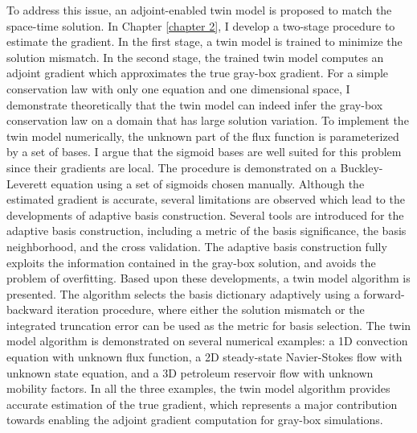 To address this issue, an adjoint-enabled twin model is proposed 
to match the space-time solution.
In Chapter \ref{chapter 2}, I develop a two-stage procedure to estimate the gradient.
In the first stage, a twin model is trained to minimize the solution mismatch.
In the second stage, the trained twin model
computes an adjoint gradient which approximates the true gray-box gradient.
For a simple conservation law with only one equation and one dimensional space,
I demonstrate theoretically that the twin model can indeed infer the gray-box 
conservation law on a domain that has large solution variation.
To implement the twin model numerically,
the unknown part of the flux function is parameterized by a set of bases.
I argue that the sigmoid bases are well suited for this problem since
their gradients are local. The procedure is demonstrated
on a Buckley-Leverett equation using a set of sigmoids chosen manually.
Although the estimated gradient is accurate, several limitations are observed
which lead to the developments of adaptive basis construction.
Several tools are introduced for the adaptive basis construction,
including a metric of the basis significance, the basis neighborhood, 
and the cross validation.
The adaptive basis construction 
fully exploits the information contained in the
gray-box solution, and avoids the problem of overfitting.
Based upon these developments, a twin model algorithm is presented.
The algorithm selects the basis dictionary adaptively using a forward-backward iteration
procedure, where either the solution mismatch or the integrated truncation error
can be used as the metric for basis selection.
The twin model algorithm is demonstrated on 
several numerical examples:
a 1D convection equation with unknown 
flux function, a 2D steady-state Navier-Stokes flow with unknown state equation,
and a 3D petroleum reservoir flow with unknown mobility factors.
In all the three examples, the twin model algorithm provides accurate estimation
of the true gradient, which represents a major contribution towards enabling the
adjoint gradient computation for gray-box simulations.\\

